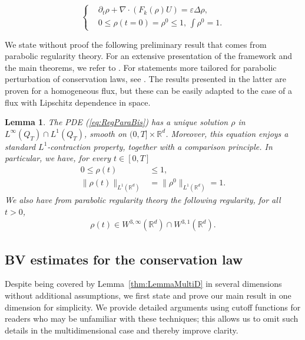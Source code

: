 \documentclass[11pt,twoside]{article}
\numberwithin{equation}{section}
\newcommand{\R}{\mathbb{R}}
\newcommand {\eps}  {\varepsilon}
\newtheorem{lemma}[theorem]{Lemma}
\begin{document}
\begin{equation}
\label{eq:RegParaBis}
\left\{\begin{aligned}
&\partial_t \rho + \nabla \cdot (F_k(\rho)U) = \eps \Delta \rho, \\
&0 \leq \rho(t=0) = \rho^0 \leq 1, \, \int \rho^0  =1.
\end{aligned}\right.
\end{equation}

We state without proof the following preliminary result that comes from parabolic regularity theory. For an extensive presentation of the framework and the main theorems, we refer to \cite{ladyzhenskaia_linear_1968, lieberman_second_2005}. For statements more tailored for parabolic perturbation of conservation laws, see \cite{malek_weak_1996}. The results presented in the latter are proven for a homogeneous flux, but these can be easily adapted to the case of a flux with Lipschitz dependence in space.

\begin{lemma}
\label{lm:Prel}
The PDE (\ref{eq:RegParaBis}) has a unique solution $\rho$ in $L^\infty(Q_T)\cap L^1(Q_T)$, smooth on $(0,T] \times \R^d$. Moreover, this equation enjoys a standard $L^1$-contraction property, together with a comparison principle. In particular, we have, for every $t \in [0,T]$
\begin{align*}
0 \le \rho(t) &\le 1, \\
\| \rho(t) \|_{L^1(\R^d)} &= \| \rho^0 \|_{L^1(\R^d)} = 1.
\end{align*}
We also have from parabolic regularity theory the following regularity, for all $t>0$, 
\begin{align*}
\rho(t) \in W^{3,\infty}(\R^d)\cap W^{3,1}(\R^d).
\end{align*}
\end{lemma}


\subsection{BV estimates for the conservation law}

Despite being covered by Lemma~\ref{thm:LemmaMultiD} in several dimensions without additional assumptions, we first state and prove our main result in one dimension for simplicity. We provide detailed arguments using cutoff functions for readers who may be unfamiliar with these techniques; this allows us to omit such details in the multidimensional case and thereby improve clarity.
\end{document}
